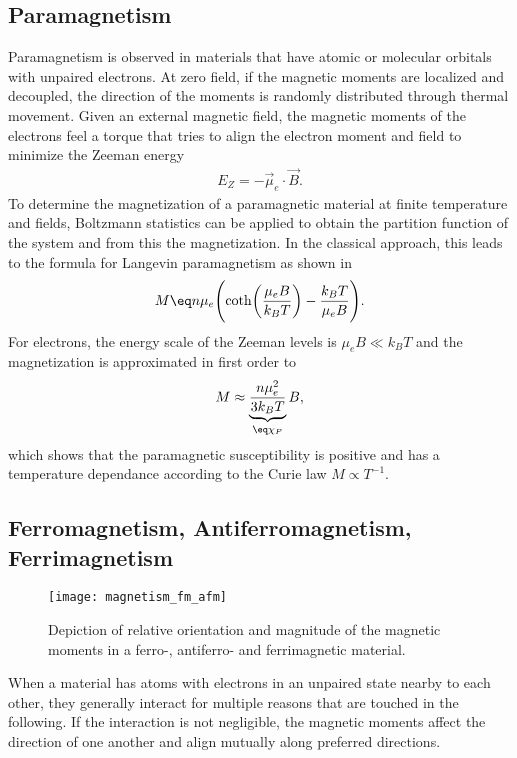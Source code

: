 \documentclass[\main/dresen_thesis.tex]{subfiles}
\begin{document}
  \subsection{Paramagnetism}\label{ch:theoreticalBackground:magnetism:paramagnetism}
    Paramagnetism is observed in materials that have atomic or molecular orbitals with unpaired electrons.
    At zero field, if the magnetic moments are localized and decoupled, the direction of the moments is randomly distributed through thermal movement.
    Given an external magnetic field, the magnetic moments of the electrons feel a torque that tries to align the electron moment and field to minimize the Zeeman energy
    \begin{align}
      E_Z = - \vec{\mu}_e \cdot \vec{B}.
    \end{align}
    To determine the magnetization of a paramagnetic material at finite temperature and fields, Boltzmann statistics can be applied to obtain the partition function of the system and from this the magnetization.
    In the classical approach, this leads to the formula for Langevin paramagnetism as shown in 
    \begin{align}
      M \eq n \mu_e \Biggl( \coth \biggl(\frac{\mu_e B}{k_B T} \biggr) - \frac{k_B T}{\mu_e B} \Biggr).
    \end{align}
    For electrons, the energy scale of the Zeeman levels is $\mu_e B \ll k_B T$ and the magnetization is approximated in first order to
    \begin{align}
      M \approx \underbrace{\frac{n \mu_e^2}{3k_B T}}_{\eq \chi_P} B,
    \end{align}
    which shows that the paramagnetic susceptibility is positive and has a temperature dependance according to the Curie law $M \propto T^{-1}$.

  \subsection{Ferromagnetism, Antiferromagnetism, Ferrimagnetism}
    \begin{figure}[tb]
      \centering
      \texttt{[image: magnetism\_fm\_afm]}
      \caption{\label{fig:theoreticalBackground:magnetism:fm_afm_fim}Depiction of relative orientation and magnitude of the magnetic moments in a ferro-, antiferro- and ferrimagnetic material.}
    \end{figure}

    When a material has atoms with electrons in an unpaired state nearby to each other, they generally interact for multiple reasons that are touched in the following.
    If the interaction is not negligible, the magnetic moments affect the direction of one another and align mutually along preferred directions.
\end{document}
